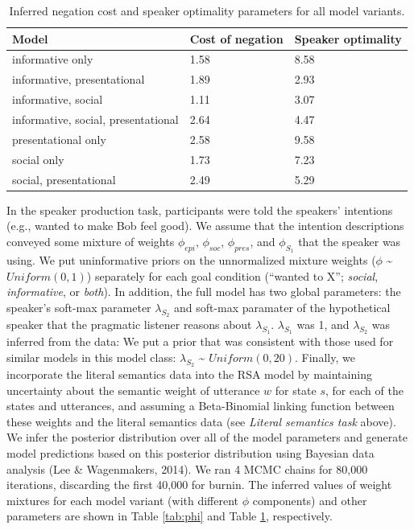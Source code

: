 \documentclass[12pt]{article}
\begin{document}
\begin{table}[tbp]
\begin{center}
\begin{threeparttable}
\caption{\label{tab:otherParams}Inferred negation cost and speaker optimality parameters for all model variants.}
\begin{tabular}{lll}
\toprule
Model & \multicolumn{1}{c}{Cost of negation} & \multicolumn{1}{c}{Speaker optimality}\\
\midrule
informative only & 1.58 & 8.58\\
informative, presentational & 1.89 & 2.93\\
informative, social & 1.11 & 3.07\\
informative, social, presentational & 2.64 & 4.47\\
presentational only & 2.58 & 9.58\\
social only & 1.73 & 7.23\\
social, presentational & 2.49 & 5.29\\
\bottomrule
\end{tabular}
\end{threeparttable}
\end{center}
\end{table}

In the speaker production task, participants were told the speakers'
intentions (e.g., wanted to make Bob feel good). We assume that the
intention descriptions conveyed some mixture of weights \(\phi_{epi}\),
\(\phi_{soc}\), \(\phi_{pres}\), and \(\phi_{S_1}\) that the speaker was
using. We put uninformative priors on the unnormalized mixture weights
(\(\phi\) \textasciitilde{} \(Uniform(0,1)\)) separately for each goal
condition (\enquote{wanted to X}; \emph{social}, \emph{informative}, or
\emph{both}). In addition, the full model has two global parameters: the
speaker's soft-max parameter \(\lambda_{S_2}\) and soft-max paramater of
the hypothetical speaker that the pragmatic listener reasons about
\(\lambda_{S_1}\). \(\lambda_{S_1}\) was 1, and \(\lambda_{S_2}\) was
inferred from the data: We put a prior that was consistent with those
used for similar models in this model class: \(\lambda_{S_2}\)
\textasciitilde{} \(Uniform(0,20)\). Finally, we incorporate the literal
semantics data into the RSA model by maintaining uncertainty about the
semantic weight of utterance \(w\) for state \(s\), for each of the
states and utterances, and assuming a Beta-Binomial linking function
between these weights and the literal semantics data (see \emph{Literal
semantics task} above). We infer the posterior distribution over all of
the model parameters and generate model predictions based on this
posterior distribution using Bayesian data analysis (Lee \& Wagenmakers,
2014). We ran 4 MCMC chains for 80,000 iterations, discarding the first
40,000 for burnin. The inferred values of weight mixtures for each model
variant (with different \(\phi\) components) and other parameters are
shown in Table \ref{tab:phi} and Table \ref{tab:otherParams},
respectively.
\end{document}
